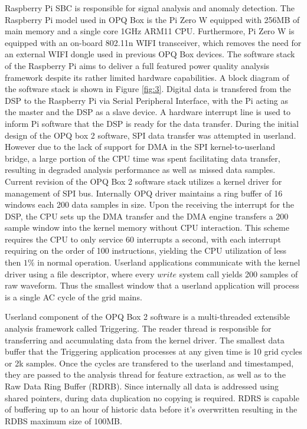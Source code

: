 Raspberry Pi SBC is responsible for signal analysis and anomaly detection. The Raspberry Pi model used in OPQ Box is the Pi Zero W equipped with 256MB of main memory and a single core 1GHz ARM11 CPU. Furthermore, Pi Zero W is equipped with an on-board 802.11n WIFI transceiver, which removes the need for an external WIFI dongle used in previous OPQ Box devices. The software stack of the Raspberry Pi aims to deliver a full featured power quality analysis framework despite its rather limited hardware capabilities. A block diagram of the software stack is shown in Figure \ref{fig:3}. Digital data is transfered from the DSP to the Raspberry Pi via Serial Peripheral Interface, with the Pi acting as the master and the DSP as a slave device. A hardware interrupt line is used to inform Pi software that the DSP is ready for the data transfer. During the initial design of the OPQ box 2 software, SPI data transfer was attempted in userland. However due to the lack of support for DMA in the SPI kernel-to-userland bridge, a large portion of the CPU time was spent facilitating data transfer, resulting in degraded analysis performance as well as missed data samples. Current revision of the OPQ Box 2 software stack utilizes a kernel driver for management of SPI bus. Internally OPQ driver maintains a ring buffer of 16 windows each 200 data samples in size. Upon the receiving the interrupt for the DSP, the CPU sets up the DMA transfer and the DMA engine transfers a 200 sample window into the kernel memory without CPU interaction. This scheme requires the CPU to only service 60 interrupts a second, with each interrupt requiring on the order of 100 instructions, yielding the CPU utilization of less then $1\%$ in normal operation. Userland applications communicate with the kernel driver using a file descriptor, where every $write$ system call yields 200 samples of raw waveform. Thus the smallest window that a userland application will process is a single AC cycle of the grid mains.

Userland component of the OPQ Box 2 software is a multi-threaded extensible analysis framework called Triggering. The reader thread is responsible for transferring and accumulating data from the kernel driver. The smallest data buffer that the Triggering application processes at any given time is 10 grid cycles or 2k samples. Once the cycles are transfered to the userland and timestamped, they are passed to the analysis thread for feature extraction, as well as to the Raw Data Ring Buffer (RDRB). Since internally all data is addressed using shared pointers, during data duplication no copying is required. RDRS is capable of buffering up to an hour of historic data before it's overwritten resulting in the RDBS maximum size of 100MB. 

